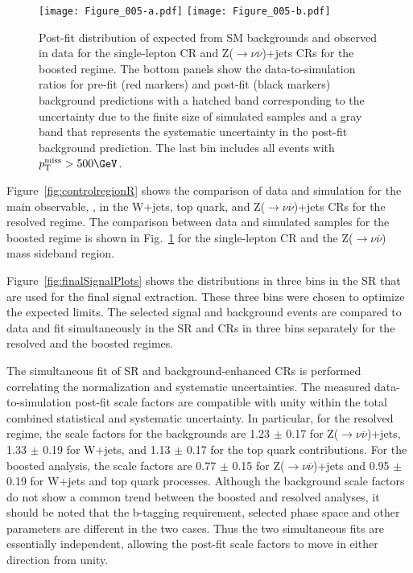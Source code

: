 \begin{figure}[htbp]
\centering
\texttt{[image: Figure\_005-a.pdf]}
\texttt{[image: Figure\_005-b.pdf]}
\caption{Post-fit distribution of \MET expected from SM backgrounds and observed in data for the single-lepton CR and Z($\rightarrow\nu\overline{\nu}$)+jets CRs for the boosted regime. The bottom panels show the data-to-simulation ratios for pre-fit (red markers) and post-fit (black markers) background predictions with a hatched band corresponding to the uncertainty due to the finite size of simulated samples and a gray band that represents the systematic uncertainty in the post-fit background prediction. The last bin includes all events with $\MET > 500\GeV$.}
\label{fig:controlregionB}
\end{figure}

Figure~\ref{fig:controlregionR} shows the comparison of data and simulation for the main observable, \MET, in the W+jets, top quark, and Z($\rightarrow\nu\overline{\nu}$)+jets  CRs for the resolved regime. 
The comparison between data and simulated samples for the boosted regime is shown in Fig.~\ref{fig:controlregionB} for the single-lepton CR and the Z($\rightarrow\nu\overline{\nu}$) 
mass sideband region. %

Figure~\ref{fig:finalSignalPlots} shows the \MET distributions in three bins in the SR that are used for the final signal extraction. 
These three bins were chosen to optimize the expected limits.
The selected signal and background events are compared to data and fit simultaneously in the SR and CRs in three \MET bins separately 
for the resolved and the boosted regimes. 

The simultaneous fit of SR and background-enhanced CRs is performed correlating the normalization and systematic uncertainties. 
The measured data-to-simulation post-fit scale factors are compatible with unity within the total combined statistical and systematic uncertainty. In particular, for the resolved regime, the scale factors for the backgrounds are 1.23 $\pm$ 0.17 for Z($\rightarrow\nu\overline{\nu}$)+jets,  1.33 $\pm$ 0.19 for W+jets, and 1.13 $\pm$ 0.17 for the top quark 
contributions. 
For the boosted analysis, the scale factors are 0.77 $\pm$ 0.15 for Z($\rightarrow\nu\overline{\nu}$)+jets and 0.95 $\pm$ 0.19 for W+jets and top quark processes. 
Although the background scale factors do not show a common trend between the boosted and resolved analyses, it should be noted that the b-tagging requirement, selected phase space and other parameters are different in the two cases. Thus the two simultaneous fits are essentially independent, allowing the post-fit scale factors to move in either direction from unity.

